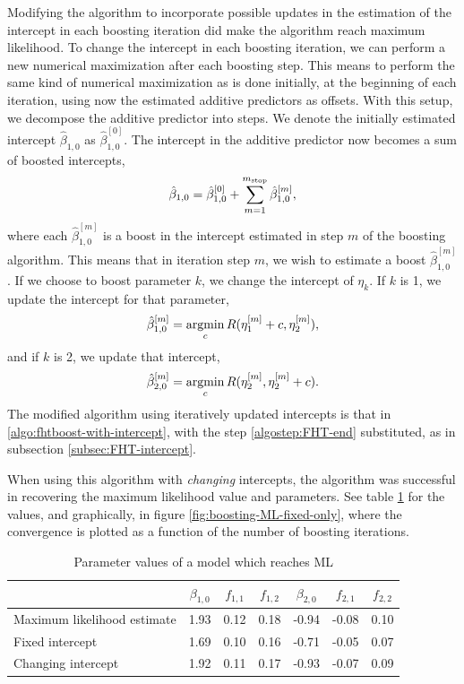 Modifying the algorithm to incorporate possible updates in the estimation of the intercept in each boosting iteration did make the algorithm reach maximum likelihood.
To change the intercept in each boosting iteration, we can perform a new numerical maximization after each boosting step.
This means to perform the same kind of numerical maximization as is done initially, at the beginning of each iteration, using now the estimated additive predictors as offsets.
With this setup, we decompose the additive predictor into steps.
We denote the initially estimated intercept $\hat{\beta}_{1,0}$ as $\hat{\beta}_{1,0}^{[0]}$.
The intercept in the additive predictor now becomes a sum of boosted intercepts,
\begin{equation}
    \hat{\beta}_{1,0}=\hat{\beta}_{1,0}^{[0]}+\sum_{m=1}^{m_{\text{stop}}}\hat{\beta}_{1,0}^{[m]},
\end{equation}
where each $\hat{\beta}_{1,0}^{[m]}$ is a boost in the intercept estimated in step $m$ of the boosting algorithm.
This means that in iteration step $m$, we wish to estimate a boost $\hat{\beta}_{1,0}^{[m]}$.
If we choose to boost parameter $k$, we change the intercept of $\eta_k$.
If $k$ is 1, we update the intercept for that parameter,
\begin{equation}
    \hat{\beta}_{1,0}^{[m]}=\operatorname*{argmin}_{c}R(\eta_1^{[m]}+c,\eta_2^{[m]}),
\end{equation}
and if $k$ is 2, we update that intercept,
\begin{equation}
    \hat{\beta}_{2,0}^{[m]}=\operatorname*{argmin}_{c}R(\eta_2^{[m]},\eta_2^{[m]}+c).
\end{equation}
The modified algorithm using iteratively updated intercepts is that in \ref{algo:fhtboost-with-intercept}, with the step \ref{algostep:FHT-end} substituted, as in subsection \ref{subsec:FHT-intercept}.

When using this algorithm with \textit{changing} intercepts, the algorithm was successful in recovering the maximum likelihood value and parameters.
See table \ref{table:ML} for the values, and graphically, in figure \ref{fig:boosting-ML-fixed-only}, where the convergence is plotted as a function of the number of boosting iterations.
\begin{table}\caption{Parameter values of a model which reaches ML}\label{table:ML}
\centering
\begin{tabular}{lcccccc}
\toprule
    & $\beta_{1,0}$ & $f_{1,1}$ & $f_{1,2}$ & $\beta_{2,0}$ & $f_{2,1}$ & $f_{2,2}$ \\
\hline
Maximum likelihood estimate     &    1.93 &    0.12 &    0.18 &    -0.94 &    -0.08 &     0.10 \\
Fixed intercept &    1.69 &    0.10 &    0.16 &    -0.71 &    -0.05 &     0.07 \\
Changing intercept    &    1.92 &    0.11 &    0.17 &    -0.93 &    -0.07 &     0.09 \\
\bottomrule
\end{tabular}\end{table}

